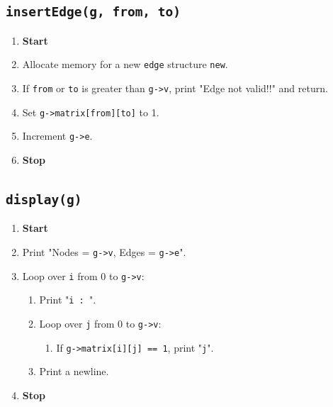 {  \subsection{\texttt{insertEdge(g, from, to)}}
  \begin{enumerate}[label=\arabic*:,left=0pt]
    \item \textbf{Start}
    \item Allocate memory for a new \texttt{edge} structure \texttt{new}.
    \item If \texttt{from} or \texttt{to} is greater than \texttt{g->v}, print "Edge not valid!!" and return.
    \item Set \texttt{g->matrix[from][to]} to 1.
    \item Increment \texttt{g->e}.
    \item \textbf{Stop}
  \end{enumerate}

  \subsection{\texttt{display(g)}}
  \begin{enumerate}[label=\arabic*:,left=0pt]
    \item \textbf{Start}
    \item Print "Nodes = \texttt{g->v}, Edges = \texttt{g->e}".
    \item Loop over \texttt{i} from 0 to \texttt{g->v}:
          \begin{enumerate}[label=2.\arabic*:, start=1]
            \item Print "\texttt{i : }".
            \item Loop over \texttt{j} from 0 to \texttt{g->v}:
                  \begin{enumerate}[label=2.2.\arabic*:, start=1]
                    \item If \texttt{g->matrix[i][j] == 1}, print "\texttt{j}".
                  \end{enumerate}
            \item Print a newline.
          \end{enumerate}
    \item \textbf{Stop}
  \end{enumerate}

}
